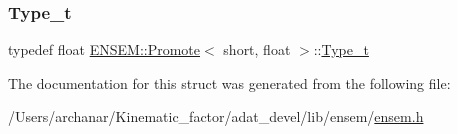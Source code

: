 \subsubsection{\texorpdfstring{Type\_t}{Type\_t}\hspace{0.1cm}{\footnotesize\ttfamily [2/2]}}
{\footnotesize\ttfamily typedef float \mbox{\hyperlink{structENSEM_1_1Promote}{E\+N\+S\+E\+M\+::\+Promote}}$<$ short, float $>$\+::\mbox{\hyperlink{structENSEM_1_1Promote_3_01short_00_01float_01_4_a1d4ac20ed44f25a8d1863eda583b89da}{Type\+\_\+t}}}



The documentation for this struct was generated from the following file\+:\begin{DoxyCompactItemize}
\item 
/\+Users/archanar/\+Kinematic\+\_\+factor/adat\+\_\+devel/lib/ensem/\mbox{\hyperlink{lib_2ensem_2ensem_8h}{ensem.\+h}}\end{DoxyCompactItemize}

